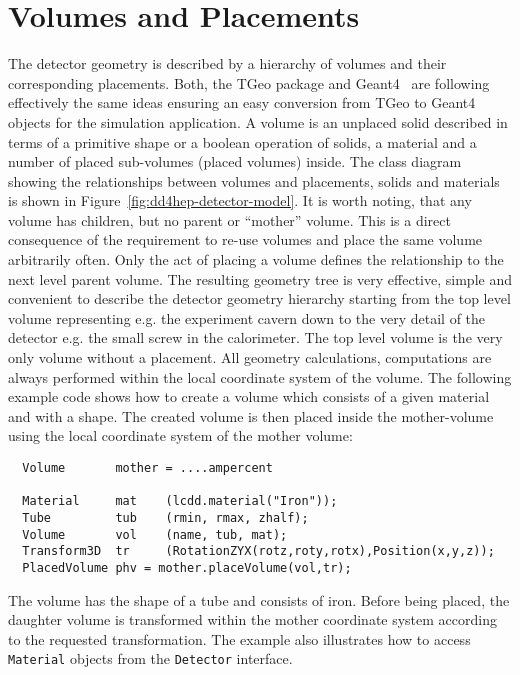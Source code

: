 \section{Volumes and Placements}

The detector geometry is described by a hierarchy of volumes and their  corresponding placements. Both, the TGeo package and Geant4~\cite{Agostinelli:2002hh} are following effectively the same ideas ensuring an easy conversion from TGeo to Geant4 objects for the simulation application. A volume is an unplaced solid de\-scribed in terms of a primitive shape or a boolean operation of solids, a material and a number of placed sub-volumes (placed volumes) inside. The class diagram showing the relationships between volumes and placements, solids and materials is shown in Figure~\ref{fig:dd4hep-detector-model}.
It is worth noting, that any volume has children, but no parent or ``mother'' volume. This is a direct consequence of the requirement to re-use volumes and place the same volume arbitrarily often. Only the act of placing a volume defines the relationship to the next level parent volume. The resulting geometry tree is very effective, simple and convenient to  describe the detector geometry hierarchy starting from the top level volume representing e.g. the experiment cavern down to the very detail of the detector e.g. the small screw in the calorimeter. The top level volume is the very only volume without a placement. All geometry calculations, computations are always  performed within the local coordinate system of the volume. The following example code shows how to create a volume which consists of a given material and with a shape. The created volume is then placed inside the mother-volume using the local coordinate system of the mother volume:

\begin{verbatim}
  Volume       mother = ....ampercent

  Material     mat    (lcdd.material("Iron"));
  Tube         tub    (rmin, rmax, zhalf);
  Volume       vol    (name, tub, mat);
  Transform3D  tr     (RotationZYX(rotz,roty,rotx),Position(x,y,z));
  PlacedVolume phv = mother.placeVolume(vol,tr);
\end{verbatim}

The volume has the shape of a tube and consists of iron. Before being placed, the daughter volume is transformed within the mother coordinate system according to the requested transformation. The example also illustrates how to access \texttt{Material} objects from the \texttt{Detector} interface.

